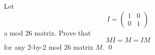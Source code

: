   Let
  \[
  I =
  \begin{pmatrix}
  1 & 0 \\
  0 & 1 
  \end{pmatrix}
  \]
  a mod 26 matrix.
  Prove that
  \[
  MI = M = IM
  \]
  for any 2-by-2 mod 26 matrix $M$.
  \qed
